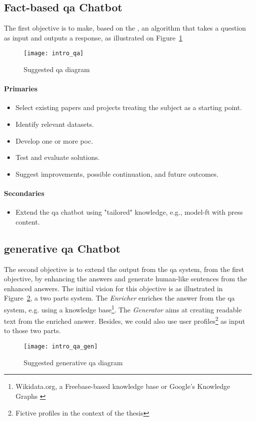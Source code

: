 \subsection{Fact-based \acrlong{qa} Chatbot}
The first objective is to make, based on the , an algorithm that takes a question as input and outputs a response, as illustrated on Figure~\ref{fig:intro_qa}
\begin{figure}[ht!]
    \centering
    \texttt{[image: intro\_qa]}
    \caption{Suggested \gls{qa} diagram}
    \label{fig:intro_qa}
\end{figure}

\paragraph{Primaries}
\begin{itemize}[noitemsep]
    \item Select existing papers and projects treating the subject as a starting point.
    \item Identify relevant datasets.
    \item Develop one or more \gls{poc}.
    \item Test and evaluate solutions.
    \item Suggest improvements, possible continuation, and future outcomes.
\end{itemize}
\paragraph{Secondaries}
\begin{itemize}[noitemsep]
    \item Extend the \gls{qa} chatbot using "tailored" knowledge, e.g., \gls{model-ft} with press content.
\end{itemize}

\subsection{\gls{generative} \gls{qa} Chatbot}
The second objective is to extend the output from the \gls{qa} system, from the first objective, by enhancing the answers and generate human-like sentences from the enhanced answers. The initial vision for this objective is as illustrated in Figure~\ref{fig:intro_qa_gen}, a two parts system. The \textit{Enricher} enriches the answer from the \gls{qa} system, e.g. using a knowledge base\footnote{Wikidata.org, a Freebase-based  \autocite{paper:bollacker2008} knowledge base or Google's Knowledge Graphs \autocite{blog:intro_knowledge_graph}}. The \textit{Generator} aims at creating readable text from the enriched answer. Besides, we could also use user profiles\footnote{Fictive profiles in the context of the thesis} as input to those two parts.
\begin{figure}[ht!]
    \centering
    \texttt{[image: intro\_qa\_gen]}
    \caption{Suggested \gls{generative} \gls{qa} diagram}
    \label{fig:intro_qa_gen}
\end{figure}


